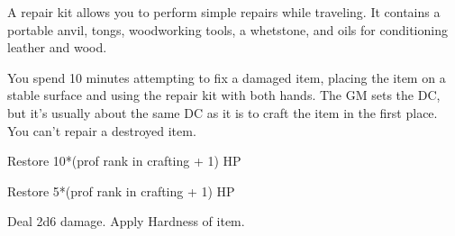 

A repair kit allows you to perform simple repairs while traveling.
It contains a portable anvil, tongs, woodworking tools, a whetstone, and oils for conditioning leather and wood.

You spend 10 minutes attempting to fix a damaged item, placing the item on a stable surface and using the repair kit with both hands.
The GM sets the DC, but it's usually about the same DC as it is to craft the item in the first place.
You can't repair a destroyed item.

 Restore 10*(prof rank in crafting + 1) HP

 Restore 5*(prof rank in crafting + 1) HP

 Deal 2d6 damage. Apply Hardness of item.


\vfill

\hfill{}
